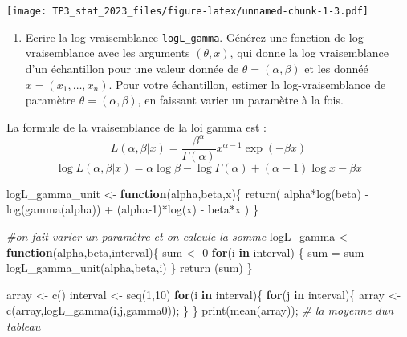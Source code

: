 \documentclass[
]{article}
\newenvironment{Shaded}{\begin{snugshade}}{\end{snugshade}}
\newcommand{\CommentTok}[1]{\textcolor[rgb]{0.56,0.35,0.01}{\textit{#1}}}
\newcommand{\ControlFlowTok}[1]{\textcolor[rgb]{0.13,0.29,0.53}{\textbf{#1}}}
\newcommand{\DecValTok}[1]{\textcolor[rgb]{0.00,0.00,0.81}{#1}}
\newcommand{\FunctionTok}[1]{\textcolor[rgb]{0.00,0.00,0.00}{#1}}
\newcommand{\NormalTok}[1]{#1}
\newcommand{\OtherTok}[1]{\textcolor[rgb]{0.56,0.35,0.01}{#1}}
\newcommand{\SpecialCharTok}[1]{\textcolor[rgb]{0.00,0.00,0.00}{#1}}
\providecommand{\tightlist}{%
  \setlength{\itemsep}{0pt}\setlength{\parskip}{0pt}}
\begin{document}
\texttt{[image: TP3\_stat\_2023\_files/figure-latex/unnamed-chunk-1-3.pdf]}

\begin{enumerate}
\def\labelenumi{\arabic{enumi}.}
\setcounter{enumi}{7}
\tightlist
\item
  Ecrire la log vraisemblance \texttt{logL\_gamma}. Générez une fonction
  de log-vraisemblance avec les arguments \((\theta, x)\), qui donne la
  log vraisemblance d'un échantillon pour une valeur donnée de
  \(\theta=(\alpha,\beta)\) et les donnéé \(x = (x_1,\ldots,x_n)\). Pour
  votre échantillon, estimer la log-vraisemblance de paramètre
  \(\theta=(\alpha,\beta)\), en faissant varier un paramètre à la fois.
\end{enumerate}

La formule de la vraisemblance de la loi gamma est : \[
L(\alpha ,\beta |x)={\frac {\beta ^{\alpha }}{\Gamma (\alpha )}}x^{\alpha -1}\exp(-\beta x)
\] \[
\log L(\alpha ,\beta |x)=\alpha \log \beta -\log \Gamma (\alpha )+(\alpha -1)\log x-\beta x
\]

\begin{Shaded}
\begin{Highlighting}[]
\NormalTok{logL\_gamma\_unit }\OtherTok{\textless{}{-}} \ControlFlowTok{function}\NormalTok{(alpha,beta,x)\{}
  \FunctionTok{return}\NormalTok{( alpha}\SpecialCharTok{*}\FunctionTok{log}\NormalTok{(beta) }\SpecialCharTok{{-}} \FunctionTok{log}\NormalTok{(}\FunctionTok{gamma}\NormalTok{(alpha)) }\SpecialCharTok{+}\NormalTok{ (alpha}\DecValTok{{-}1}\NormalTok{)}\SpecialCharTok{*}\FunctionTok{log}\NormalTok{(x) }\SpecialCharTok{{-}}\NormalTok{ beta}\SpecialCharTok{*}\NormalTok{x ) }
\NormalTok{\}}

\CommentTok{\#on fait varier un paramètre et on calcule la somme }
\NormalTok{logL\_gamma }\OtherTok{\textless{}{-}} \ControlFlowTok{function}\NormalTok{(alpha,beta,interval)\{}
\NormalTok{  sum }\OtherTok{\textless{}{-}} \DecValTok{0}
  \ControlFlowTok{for}\NormalTok{(i }\ControlFlowTok{in}\NormalTok{ interval) \{}
\NormalTok{    sum }\OtherTok{=}\NormalTok{  sum }\SpecialCharTok{+} \FunctionTok{logL\_gamma\_unit}\NormalTok{(alpha,beta,i)}
\NormalTok{  \}}
  \FunctionTok{return}\NormalTok{ (sum)}
\NormalTok{\}}
\end{Highlighting}
\end{Shaded}

\begin{Shaded}
\begin{Highlighting}[]
\NormalTok{array }\OtherTok{\textless{}{-}} \FunctionTok{c}\NormalTok{()}
\NormalTok{interval }\OtherTok{\textless{}{-}} \FunctionTok{seq}\NormalTok{(}\DecValTok{1}\NormalTok{,}\DecValTok{10}\NormalTok{)}
\ControlFlowTok{for}\NormalTok{(i }\ControlFlowTok{in}\NormalTok{ interval)\{}
  \ControlFlowTok{for}\NormalTok{(j }\ControlFlowTok{in}\NormalTok{ interval)\{}
\NormalTok{    array }\OtherTok{\textless{}{-}} \FunctionTok{c}\NormalTok{(array,}\FunctionTok{logL\_gamma}\NormalTok{(i,j,gamma0));}
\NormalTok{  \}}
\NormalTok{\}}
\FunctionTok{print}\NormalTok{(}\FunctionTok{mean}\NormalTok{(array)); }\CommentTok{\# la moyenne d\textquotesingle{}un tableau}
\end{Highlighting}
\end{Shaded}
\end{document}
